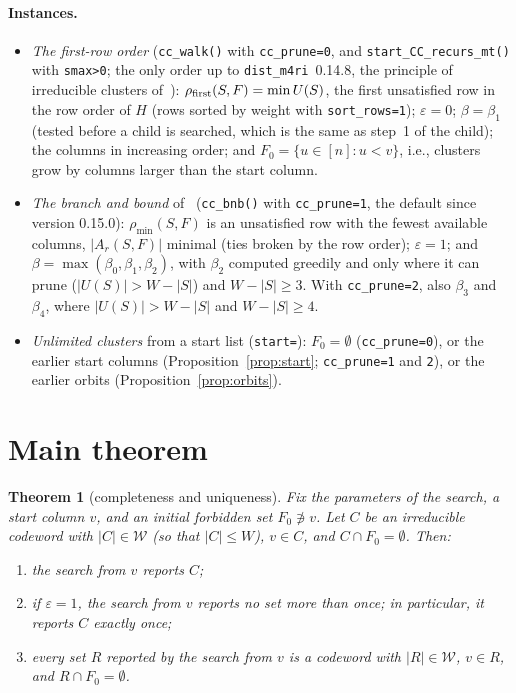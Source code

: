 \documentclass[11pt]{article}
\newtheorem{theorem}{Theorem}
\theoremstyle{definition}
\newcommand{\Wr}{\mathcal{W}}   %
\newcommand{\ttt}[1]{\texttt{#1}}
\begin{document}
\paragraph{Instances.}
\begin{itemize}
  \item \emph{The first-row order} (\ttt{cc\_walk()} with \ttt{cc\_prune=0}, and \ttt{start\_CC\_recurs\_mt()} with
    \ttt{smax>0}; the only order up to \ttt{dist\_m4ri}~0.14.8,
    the principle of irreducible clusters of~\cite{DKP17}): $\rho_{\rm first}(S,F)=\min U(S)$, the first unsatisfied
    row in the row order of $H$ (rows sorted by weight with \ttt{sort\_rows=1}); $\varepsilon=0$; $\beta=\beta_1$
    (tested before a child is searched, which is the same as step~1 of the child); the columns in increasing order; and
    $F_0=\{u\in[n]:u<v\}$, i.e., clusters grow by columns larger than the start column.
  \item \emph{The branch and bound} of~\cite{LOMKZ26} (\ttt{cc\_bnb()} with \ttt{cc\_prune=1}, the default since
    version 0.15.0): $\rho_{\min}(S,F)$ is an unsatisfied row
    with the fewest available columns, $|A_r(S,F)|$ minimal (ties broken by the row order); $\varepsilon=1$; and
    $\beta=\max(\beta_0,\beta_1,\beta_2)$, with $\beta_2$ computed greedily and only where it can prune
    ($|U(S)|>W-|S|$) and $W-|S|\ge3$. With \ttt{cc\_prune=2}, also $\beta_3$ and $\beta_4$, where
    $|U(S)|>W-|S|$ and $W-|S|\ge4$.
  \item \emph{Unlimited clusters} from a start list (\ttt{start=}): $F_0=\emptyset$ (\ttt{cc\_prune=0}), or the earlier
    start columns (Proposition~\ref{prop:start}; \ttt{cc\_prune=1} and \ttt{2}), or the earlier orbits
    (Proposition~\ref{prop:orbits}).
\end{itemize}

\section{Main theorem}\label{sec:main}

\begin{theorem}[completeness and uniqueness]\label{thm:main}
Fix the parameters of the search, a start column $v$, and an initial forbidden set $F_0\not\ni v$. Let $C$ be an
irreducible codeword with $|C|\in\Wr$ (so that $|C|\le W$), $v\in C$, and $C\cap F_0=\emptyset$. Then:
\begin{enumerate}[label=(\roman*)]
  \item the search from $v$ reports $C$;
  \item if $\varepsilon=1$, the search from $v$ reports no set more than once; in particular, it reports $C$ exactly
    once;
  \item every set $R$ reported by the search from $v$ is a codeword with $|R|\in\Wr$, $v\in R$, and
    $R\cap F_0=\emptyset$.
\end{enumerate}
\end{theorem}
\end{document}

